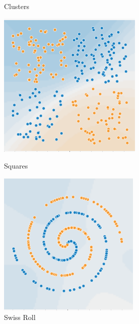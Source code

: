 \begin{figure}[!htb]
  \caption{Clusters}\label{}
\endminipage\hfill
{}
  \includegraphics[width=\linewidth]{plots/Squares}
  \caption{Squares}\label{}
\endminipage\hfill
{}
  \includegraphics[width=\linewidth]{plots/SwissRoll}
  \caption{Swiss Roll}\label{}
\endminipage
\end{figure}

